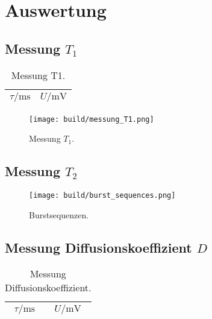 \section{Auswertung}%
\label{sec:auswertung}

\subsection{Messung $T_1$}%
\label{sub:messung_t_1_}

\begin{table}[ht]
  \centering
  \caption{Messung T1.}%
  \label{tab:t1}
  \begin{tabular}{c c}
    \toprule
    {$\tau / \si{\milli\second}$} & {$U / \si{\milli\volt}$} \\
    \midrule
    
    \bottomrule
  \end{tabular}
\end{table}

\begin{figure}[ht]
  \centering
  \texttt{[image: build/messung\_T1.png]}
  \caption{Messung $T_1$.}%
  \label{fig:messung_T1}
\end{figure}

\subsection{Messung $T_2$}%
\label{sub:messung_t_2_}

\begin{figure}[ht]
  \centering
  \texttt{[image: build/burst\_sequences.png]}
  \caption{Burstsequenzen.}%
  \label{fig:burst_sequences}
\end{figure}

\subsection{Messung Diffusionskoeffizient $D$}%
\label{sub:messung_diffusionskoeffizient_d_}

\begin{table}[ht]
  \centering
  \caption{Messung Diffusionskoeffizient.}%
  \label{tab:diffusionskoeffizient}
  \begin{tabular}{c c}
    \toprule
    {$\tau / \si{\milli\second}$} & {$U / \si{\milli\volt}$} \\
    \midrule
    
    \bottomrule
  \end{tabular}
\end{table}

